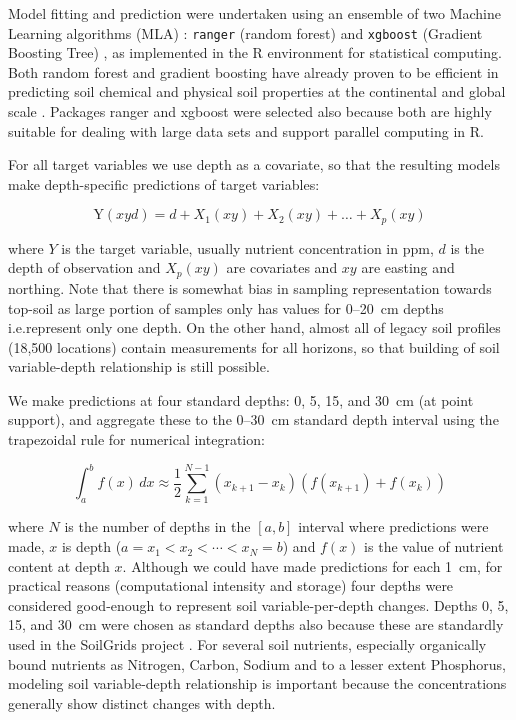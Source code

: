 \begin{linenumbers}
Model fitting and prediction were undertaken using an ensemble of two Machine Learning algorithms (MLA) \citep{Hengl2016SoilGrids250}: \texttt{ranger} (random forest) \citep{Wright2016} and \texttt{xgboost} (Gradient Boosting Tree) \citep{2016arXiv160302754C}, as implemented in the \textsf{R} environment for statistical computing. Both random forest and gradient boosting have already proven to be efficient in predicting soil chemical and physical soil properties at the continental and global scale \citep{Hengl2016SoilGrids250}. Packages \textsf{ranger} and \textsf{xgboost} were selected also because both are highly suitable for dealing with large data sets and support parallel computing in \textsf{R}.  \par

For all target variables we use depth as a covariate, so that the resulting models make depth-specific predictions of target variables: 

\begin{equation}\label{E:socd_m}
\mathrm{Y}(xyd) = d + X_1 (xy) + X_2 (xy) + \ldots + X_p (xy)
\end{equation}

\noindent where $Y$ is the target variable, usually nutrient concentration in ppm, $d$ is the depth of observation and $X_p (xy)$ are covariates and $xy$ are easting and northing. Note that there is somewhat bias in sampling representation towards top-soil as large portion of samples only has values for 0--\SI{20}{\centi\metre} depths i.e.\@ represent only one depth. On the other hand, almost all of legacy soil profiles (18,500 locations) contain measurements for all horizons, so that building of soil variable-depth relationship is still possible. \par 

We make predictions at four standard depths: 0, 5, 15, and \SI{30}{\centi\metre} (at point support), and aggregate these to the 0--\SI{30}{\centi\metre} standard depth interval using the trapezoidal rule for numerical integration:

\begin{equation}\label{Eq:trap}
  \int_{a}^{b} f(x)\, dx \approx \frac{1}{2} \sum_{k=1}^{N-1} \left( x_{k+1} - x_{k} \right) \left( f(x_{k+1}) + f(x_{k}) \right)
\end{equation}

\noindent where $N$ is the number of depths in the $[a,b]$ interval where predictions were made, $x$ is depth ($a=x_{1}<x_{2}< \cdots <x_{N}=b$) and $f(x)$ is the value of nutrient content at depth $x$. Although we could have made predictions for each \SI{1}{\centi\metre}, for practical reasons (computational intensity and storage) four depths were considered good-enough to represent soil variable-per-depth changes. Depths 0, 5, 15, and \SI{30}{\centi\metre} were chosen as standard depths also because these are standardly used in the SoilGrids project \citep{Hengl2016SoilGrids250}. For several soil nutrients, especially organically bound nutrients as Nitrogen, Carbon, Sodium and to a lesser extent Phosphorus, modeling soil variable-depth relationship is important because the concentrations generally show distinct changes with depth. \par


\end{linenumbers}
